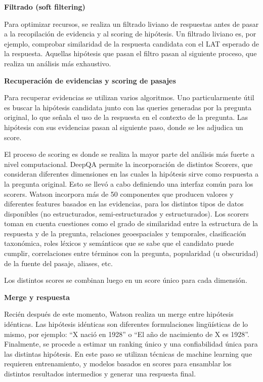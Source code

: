 \textbf{Filtrado (soft filtering)}\newline


Para optimizar recursos, se realiza un filtrado liviano de respuestas
antes de pasar a la recopilación de evidencia y al scoring de
hipótesis. Un filtrado liviano es, por ejemplo, comprobar similaridad
de la respuesta candidata con el LAT esperado de la respuesta. Aquellas
hipótesis que pasan el filtro pasan al siguiente proceso, que realiza
un análisis más exhaustivo. \newline 

\textbf{Recuperación de evidencias y scoring de pasajes}\newline

Para recuperar evidencias se utilizan varios algoritmos. Uno
particularmente útil es buscar la hipótesis candidata junto con las
queries generadas por la pregunta original, lo que señala el uso de
la respuesta en el contexto de la pregunta.  Las hipótesis con sus
evidencias pasan al siguiente paso, donde se les adjudica un score. 

El proceso de scoring es donde se realiza la mayor parte del análisis
más fuerte a nivel computacional. DeepQA permite la incorporación
de distintos Scorers, que consideran diferentes dimensiones en las
cuales la hipótesis sirve como respuesta a la pregunta original. Esto
se llevó a cabo definiendo una interfaz común para los scorers.
Watson incorpora más de 50 componentes que producen valores y
diferentes features basados en las evidencias, para los distintos tipos
de datos disponibles (no estructurados, semi-estructurados y
estructurados). Los scorers toman en cuenta cuestiones como el grado de
similaridad entre la estructura de la respuesta y de la pregunta,
relaciones geoespaciales y temporales, clasificación taxonómica,
roles léxicos y semánticos que se sabe que el candidato puede
cumplir, correlaciones entre términos con la pregunta, popularidad (u
obscuridad) de la fuente del pasaje, aliases, etc.

Los distintos scores se combinan luego en un score único para cada
dimensión. \newline 

\textbf{Merge y respuesta}\newline

Recién después de este momento, Watson realiza un merge entre
hipótesis idénticas. Las hipótesis idénticas son diferentes
formulaciones lingüísticas de lo mismo, por ejemplo:
{\textquotedblleft}X nació en 1928{\textquotedblright} o
{\textquotedblleft}El año de nacimiento de X es
1928{\textquotedblright}. Finalmente, se procede a estimar un ranking
único y una confiabilidad única para las distintas hipótesis. En
este paso se utilizan técnicas de machine learning que requieren
entrenamiento, y modelos basados en scores para ensamblar los distintos
resultados intermedios y generar una respuesta final.

